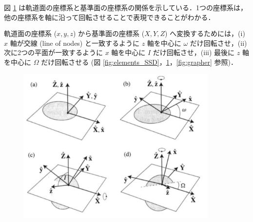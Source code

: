 \documentclass[11pt,a4paper,oneside,onecolumn]{jarticle}
\begin{document}
図 \ref{fig:xyzXYZ} は軌道面の座標系と基準面の座標系の関係を示している．1つの座標系は，他の座標系を軸に沿って回転させることで表現できることがわかる．

軌道面の座標系 ($x, y, z$) から基準面の座標系 ($X, Y, Z$) へ変換するためには，(i) $x$ 軸が交線 (line of nodes) と一致するように $z$ 軸を中心に $\omega$ だけ回転させ，(ii) 次に2つの平面が一致するように $x$ 軸を中心に $I$ だけ回転させ，(iii) 最後に $z$ 軸を中心に $\Omega$ だけ回転させる (図 \ref{fig:elements_SSD}，\ref{fig:xyzXYZ}，\ref{fig:grapher} 参照)．

\begin{figure}[H]
\centering
\includegraphics[width=10cm]{./image/sec2_14.pdf}
\caption{\label{fig:xyzXYZ}}
\end{figure}
\end{document}
